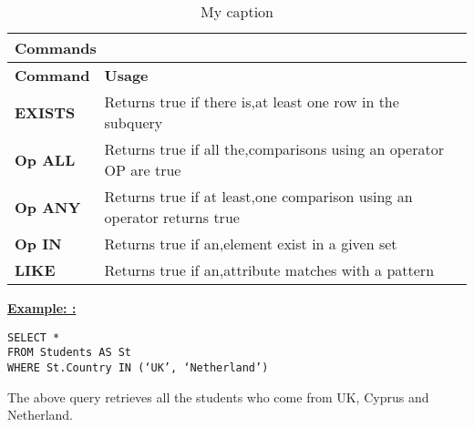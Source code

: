  
\begin{table}[h]
\centering
\caption{My caption}
\label{my-label}
\begin{tabular}{|l|l|}
\hline
\multicolumn{2}{|l|}{\textbf{Commands}}                                                                                                \\ \hline
\textbf{Command}                       & \textbf{Usage}                                                                                \\ \hline
{\color[HTML]{333333} \textbf{EXISTS}} & {\color[HTML]{333333} Returns true if there is,at least one row in the subquery}              \\ \hline
{\color[HTML]{333333} \textbf{Op ALL}} & {\color[HTML]{333333} Returns true if all the,comparisons using an operator OP are true}      \\ \hline
{\color[HTML]{333333} \textbf{Op ANY}} & {\color[HTML]{333333} Returns true if at least,one comparison using an operator returns true} \\ \hline
{\color[HTML]{333333} \textbf{Op IN}}  & {\color[HTML]{333333} Returns true if an,element exist in a given set}                        \\ \hline
{\color[HTML]{333333} \textbf{LIKE}}   & {\color[HTML]{333333} Returns true if an,attribute matches with a pattern}                    \\ \hline
\end{tabular}
\end{table}



\noindent\textbf{\underline{Example: :} }
\begin{mdframed}[backgroundcolor=gray!20] 
\begin{lstlisting}
SELECT *
FROM Students AS St 
WHERE St.Country IN (‘UK’, ‘Netherland’)
\end{lstlisting}
\end{mdframed}
The above query retrieves all the students who come from UK, Cyprus and Netherland.


